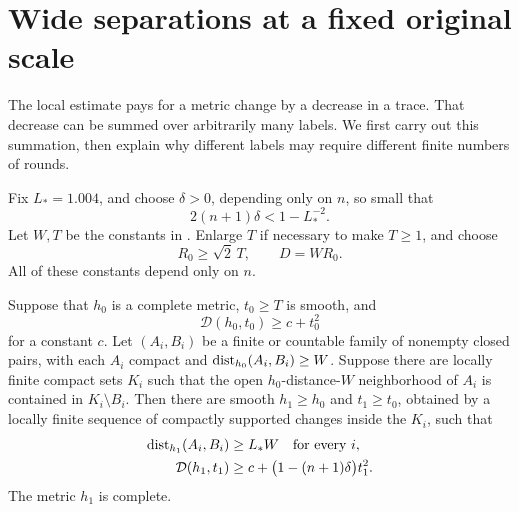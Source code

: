 \section{Wide separations at a fixed original scale}\label{sec:rounds}

The local estimate pays for a metric change by a decrease in a trace.
That decrease can be summed over arbitrarily many labels. We first carry
out this summation, then explain why different labels may require
different finite numbers of rounds.

Fix \(L_*=1.004\), and choose \(\delta>0\), depending only on \(n\), so small that
\begin{equation}\label{rounds:delta}
  2(n+1)\delta<1-L_*^{-2}.
\end{equation}
Let \(W,T\) be the constants in . Enlarge \(T\) if necessary
to make \(T\ge1\), and choose
\begin{equation}\label{rounds:original-scale}
  R_0\ge\sqrt2\,T,\qquad D=WR_0.
\end{equation}
All of these constants depend only on \(n\).

\begin{lemma}\label{rounds:round}
Suppose that \(h_0\) is a complete metric, \(t_0\ge T\) is smooth, and
\[
 \mathcal D(h_0,t_0)\ge c+t_0^2
\]
for a constant \(c\). Let \((A_i,B_i)\) be a finite or countable family of
nonempty closed pairs, with each \(A_i\) compact and
\(\operatorname{dist}_{h_0}(A_i,B_i)\ge W\). Suppose there are locally finite compact
sets \(K_i\) such that the open \(h_0\)-distance-\(W\) neighborhood of
\(A_i\) is contained in \(K_i\setminus B_i\).
Then there are smooth \(h_1\ge h_0\) and \(t_1\ge t_0\), obtained by a
locally finite sequence of compactly supported changes inside the
\(K_i\), such that
\begin{align}
 \operatorname{dist}_{h_1}(A_i,B_i)&\ge L_*W \quad\text{for every }i,\label{rounds:separation}\\
 \mathcal D(h_1,t_1)&\ge c+
 \bigl(1-(n+1)\delta\bigr)t_1^2.\label{rounds:curvature}
\end{align}
The metric \(h_1\) is complete.
\end{lemma}

